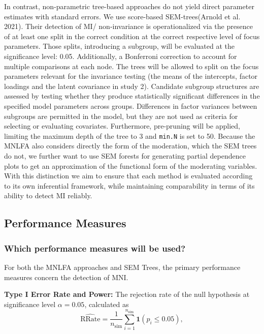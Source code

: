 \documentclass[
  man,
  floatsintext]{apa7}
\begin{document}
In contrast, non-parametric tree-based approaches do not yield direct
parameter estimates with standard errors. We use score-based
SEM-trees(Arnold et al. 2021). Their detection of MI/ non-invariance is
operationalized via the presence of at least one split in the correct
condition at the correct respective level of focus parameters. Those
splits, introducing a subgroup, will be evaluated at the significance
level: 0.05. Additionally, a Bonferroni correction to account for
multiple comparisons at each node. The trees will be allowed to split on
the focus parameters relevant for the invariance testing (the means of
the intercepts, factor loadings and the latent covariance in study 2).
Candidate subgroup structures are assessed by testing whether they
produce statistically significant differences in the specified model
parameters across groups. Differences in factor variances between
subgroups are permitted in the model, but they are not used as criteria
for selecting or evaluating covariates. Furthermore, pre-pruning will be
applied, limiting the maximum depth of the tree to 3 and \texttt{min.N}
is set to 50. Because the MNLFA also considers directly the form of the
moderation, which the SEM trees do not, we further want to use SEM
forests for generating partial dependence plots to get an approximation
of the functional form of the moderating variables.\\
With this distinction we aim to ensure that each method is evaluated
according to its own inferential framework, while maintaining
comparability in terms of its ability to detect MI reliably.

\subsection{Performance Measures}\label{performance-measures}

\subsubsection{Which performance measures will be
used?}\label{which-performance-measures-will-be-used}

For both the MNLFA approaches and SEM Trees, the primary performance
measures concern the detection of MNI.

\textbf{Type I Error Rate and Power:} The rejection rate of the null
hypothesis at significance level \(\alpha = 0.05\), calculated as \[
\widehat{\text{RRate}} = \frac{1}{n_{\text{sim}}} \sum_{i=1}^{n_{\text{sim}}} \mathbf{1}(p_i \leq 0.05),
\]
\end{document}

